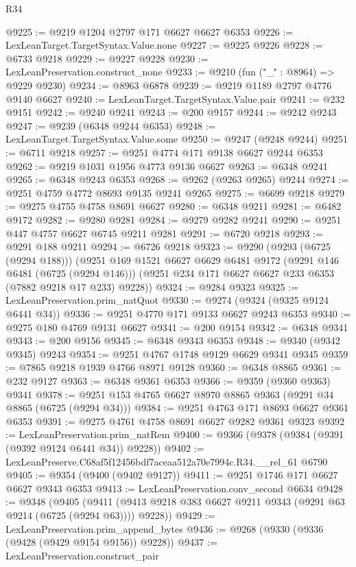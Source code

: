 \begin{lexlean}{R34}
\begin{coremodule}
@9225 := @9219 @1204 @2797 @171 @6627 @6627 @6353
@9226 := LexLeanTarget.TargetSyntax.Value.none
@9227 := @9225 @9226
@9228 := @6733 @9218
@9229 := @9227 @9228
@9230 := LexLeanPreservation.construct_none
@9233 := @9210 (fun ("_" : @8964) => @9229 @9230)
@9234 := @8963 @6878
@9239 := @9219 @1189 @2797 @4776 @9140 @6627
@9240 := LexLeanTarget.TargetSyntax.Value.pair
@9241 := @232 @9151
@9242 := @9240 @9241
@9243 := @200 @9157
@9244 := @9242 @9243
@9247 := @9239 (@6348 @9244 @6353)
@9248 := LexLeanTarget.TargetSyntax.Value.some
@9250 := @9247 (@9248 @9244)
@9251 := @6711 @9218
@9257 := @9251 @4774 @171 @9138 @6627 @9244 @6353
@9262 := @9219 @1031 @1956 @4773 @9136 @6627
@9263 := @6348 @9241
@9265 := @6348 @9243 @6353
@9268 := @9262 (@9263 @9265) @9244
@9274 := @9251 @4759 @4772 @8693 @9135 @9241 @9265
@9275 := @6699 @9218
@9279 := @9275 @4755 @4758 @8691 @6627
@9280 := @6348 @9211
@9281 := @6482 @9172
@9282 := @9280 @9281
@9284 := @9279 @9282 @9241
@9290 := @9251 @447 @4757 @6627 @6745 @9211 @9281
@9291 := @6720 @9218
@9293 := @9291 @188 @9211
@9294 := @6726 @9218
@9323 := @9290
    (@9293 (@6725 (@9294 @188)))
    (@9251
      @169
      @1521
      @6627
      @6629
      @6481
      @9172
      (@9291 @146 @6481 (@6725 (@9294 @146)))
      (@9251 @234 @171 @6627 @6627 @233 @6353 (@7882 @9218 @17 @233) @9228))
@9324 := @9284 @9323
@9325 := LexLeanPreservation.prim_natQuot
@9330 := @9274 (@9324 (@9325 @9124 @6441 @34))
@9336 := @9251 @4770 @171 @9133 @6627 @9243 @6353
@9340 := @9275 @180 @4769 @9131 @6627
@9341 := @200 @9154
@9342 := @6348 @9341
@9343 := @200 @9156
@9345 := @6348 @9343 @6353
@9348 := @9340 (@9342 @9345) @9243
@9354 := @9251 @4767 @1748 @9129 @6629 @9341 @9345
@9359 := @7865 @9218 @1939 @4766 @8971 @9128
@9360 := @6348 @8865
@9361 := @232 @9127
@9363 := @6348 @9361 @6353
@9366 := @9359 (@9360 @9363) @9341
@9378 := @9251 @153 @4765 @6627 @8970 @8865 @9363 (@9291 @34 @8865 (@6725 (@9294 @34)))
@9384 := @9251 @4763 @171 @8693 @6627 @9361 @6353
@9391 := @9275 @4761 @4758 @8691 @6627 @9282 @9361 @9323
@9392 := LexLeanPreservation.prim_natRem
@9400 := @9366 (@9378 (@9384 (@9391 (@9392 @9124 @6441 @34)) @9228))
@9402 := LexLeanPreserve.C68af5f12456bdf7aceaa512a70e7994c.R34.__rel_61 @6790
@9405 := @9354 (@9400 (@9402 @9127))
@9411 := @9251 @1746 @171 @6627 @6627 @9343 @6353
@9413 := LexLeanPreservation.conv_second @6634
@9428 := @9348
    (@9405 (@9411 (@9413 @9218 @383 @6627 @9211 @9343 (@9291 @63 @9214 (@6725 (@9294 @63)))) @9228))
@9429 := LexLeanPreservation.prim_append_bytes
@9436 := @9268 (@9330 (@9336 (@9428 (@9429 @9154 @9156)) @9228))
@9437 := LexLeanPreservation.construct_pair

\end{coremodule}
\end{lexlean}
